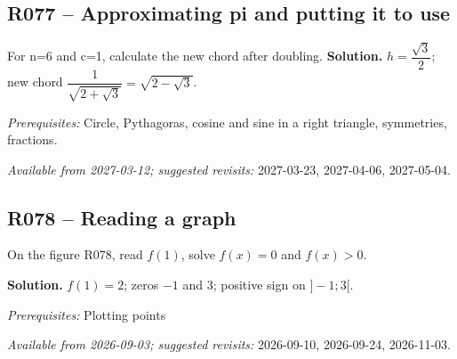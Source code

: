 \subsection*{R077 -- Approximating pi and putting it to use}\label{R077}
For n=6 and c=1, calculate the new chord after doubling.
\ifprof\textbf{Solution.} $h=\dfrac{\sqrt 3}{2}$; new chord $\dfrac{1}{\sqrt {2+\sqrt3}}=\sqrt {2-\sqrt3}$.\par\textit{Prerequisites:} Circle, Pythagoras, cosine and sine in a right triangle, symmetries, fractions.\par\textit{Available from 2027-03-12; suggested revisits:} 2027-03-23, 2027-04-06, 2027-05-04.\fi
{}
\subsection*{R078 -- Reading a graph}\label{R078}
On the figure R078, read $f(1)$, solve $f(x)=0$ and $f(x)>0$.
\begin{center}\end{center}\ifprof\textbf{Solution.} $f(1)=2$; zeros $-1$ and 3; positive sign on $]-1;3[$.\par\textit{Prerequisites:} Plotting points\par\textit{Available from 2026-09-03; suggested revisits:} 2026-09-10, 2026-09-24, 2026-11-03.\fi

